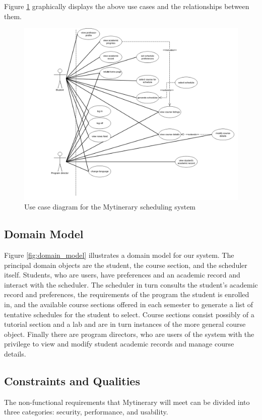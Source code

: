 \documentclass[12pt]{article}
\begin{document}
Figure \ref{fig:use_case_diagram} graphically displays the above use cases and the relationships between them.

\begin{figure}[H]
\centering
\includegraphics[width=1.4\textwidth, angle=-90]{use_case_diagram}
\caption{Use case diagram for the Mytinerary scheduling system}
\label{fig:use_case_diagram}
\end{figure}

\subsection{Domain Model}
Figure \ref{fig:domain_model} illustrates a domain model for our system. The principal domain objects are the student, the course section, and the scheduler itself. Students, who are users, have preferences and an academic record and interact with the scheduler. The scheduler in turn consults the student's academic record and preferences, the requirements of the program the student is enrolled in, and the available course sections offered in each semester to generate a list of tentative schedules for the student to select. Course sections consist possibly of a tutorial section and a lab and are in turn instances of the more general course object. Finally there are program directors, who are users of the system with the privilege to view and modify student academic records and manage course details.

\subsection{Constraints and Qualities}
The non-functional requirements that Mytinerary will meet can be divided into three categories: security, performance, and usability.
\end{document}
